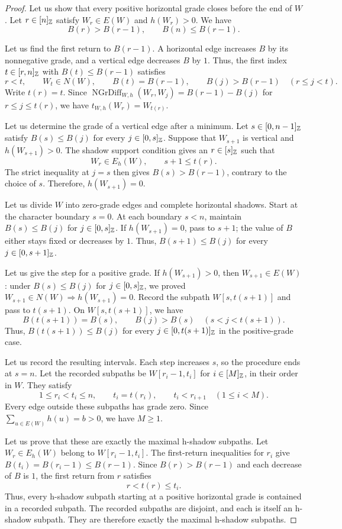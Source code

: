 \begin{proof}
Let us show that every positive horizontal grade closes before the end of $W$.
Let $r\in[n]_{\mathbb Z}$ satisfy $W_r\in E(W)$ and $h(W_r)>0$.
We have
\[
 B(r)>B(r-1),\qquad B(n)\le B(r-1).
\]

Let us find the first return to $B(r-1)$.
A horizontal edge increases $B$ by its nonnegative grade, and a vertical edge decreases $B$ by $1$.
Thus, the first index $t\in[r,n]_{\mathbb Z}$ with $B(t)\le B(r-1)$ satisfies
\[
 r<t,\qquad W_t\in N(W),\qquad B(t)=B(r-1),\qquad
 B(j)>B(r-1)\quad(r\le j<t).
\]
Write $t(r)=t$.
Since $\operatorname{NGrDiff}_{W,h}(W_r,W_j)=B(r-1)-B(j)$ for $r\le j\le t(r)$,
we have $t_{W,h}(W_r)=W_{t(r)}$.

Let us determine the grade of a vertical edge after a minimum.
Let $s\in[0,n-1]_{\mathbb Z}$ satisfy
$B(s)\le B(j)$ for every $j\in[0,s]_{\mathbb Z}$.
Suppose that $W_{s+1}$ is vertical and $h(W_{s+1})>0$.
The shadow support condition gives an $r\in[s]_{\mathbb Z}$ such that
\[
 W_r\in E_h(W),\qquad s+1\le t(r).
\]
The strict inequality at $j=s$ then gives $B(s)>B(r-1)$, contrary to the choice of $s$.
Therefore, $h(W_{s+1})=0$.

Let us divide $W$ into zero-grade edges and complete horizontal shadows.
Start at the character boundary $s=0$.
At each boundary $s<n$, maintain
$B(s)\le B(j)$ for $j\in[0,s]_{\mathbb Z}$.
If $h(W_{s+1})=0$, pass to $s+1$; the value of $B$ either stays fixed or decreases by $1$.
Thus, $B(s+1)\le B(j)$ for every $j\in[0,s+1]_{\mathbb Z}$.

Let us give the step for a positive grade.
If $h(W_{s+1})>0$, then $W_{s+1}\in E(W)$: under $B(s)\le B(j)$ for $j\in[0,s]_{\mathbb Z}$, we proved $W_{s+1}\in N(W)\Longrightarrow h(W_{s+1})=0$.
Record the subpath $W[s,t(s+1)]$ and pass to $t(s+1)$.
On $W[s,t(s+1)]$, we have
\[
 B(t(s+1))=B(s),\qquad
 B(j)>B(s)\quad(s<j<t(s+1)).
\]
Thus, $B(t(s+1))\le B(j)$ for every $j\in[0,t(s+1)]_{\mathbb Z}$ in the positive-grade case.

Let us record the resulting intervals.
Each step increases $s$, so the procedure ends at $s=n$.
Let the recorded subpaths be $W[r_i-1,t_i]$ for $i\in[M]_{\mathbb Z}$, in their order in $W$.
They satisfy
\[
 1\le r_i<t_i\le n,\qquad t_i=t(r_i),\qquad
 t_i<r_{i+1}\quad(1\le i<M).
\]
Every edge outside these subpaths has grade zero.
Since $\sum_{u\in E(W)}h(u)=b>0$, we have $M\ge1$.

Let us prove that these are exactly the maximal h-shadow subpaths.
Let $W_r\in E_h(W)$ belong to $W[r_i-1,t_i]$.
The first-return inequalities for $r_i$ give
$B(t_i)=B(r_i-1)\le B(r-1)$.
Since $B(r)>B(r-1)$ and each decrease of $B$ is $1$, the first return from $r$ satisfies
\[
 r<t(r)\le t_i.
\]
Thus, every h-shadow subpath starting at a positive horizontal grade is contained in a recorded subpath.
The recorded subpaths are disjoint, and each is itself an h-shadow subpath.
They are therefore exactly the maximal h-shadow subpaths.


\end{proof}
